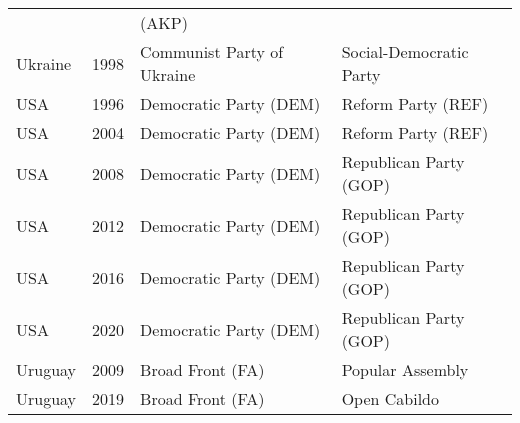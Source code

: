 {\begin{longtable}{|l|c|l|l|}
               &      &    (AKP)    &     \\ 
  Ukraine & 1998 &   Communist Party of Ukraine &   Social-Democratic Party \\ 
  USA & 1996 &   Democratic Party (DEM) &   Reform Party (REF) \\ 
    USA& 2004 &   Democratic Party (DEM) &   Reform Party (REF) \\ 
    USA& 2008 &   Democratic Party (DEM) &   Republican Party (GOP) \\ 
    USA & 2012 &   Democratic Party (DEM) &   Republican Party (GOP) \\ 
    USA & 2016 &   Democratic Party (DEM) &   Republican Party (GOP) \\ 
    USA & 2020 &   Democratic Party (DEM) &   Republican Party (GOP) \\ 
   Uruguay & 2009 &   Broad Front (FA) &   Popular Assembly \\ 
   Uruguay & 2019 &   Broad Front (FA) &   Open Cabildo \\ 
  \bottomrule
	\end{longtable} }